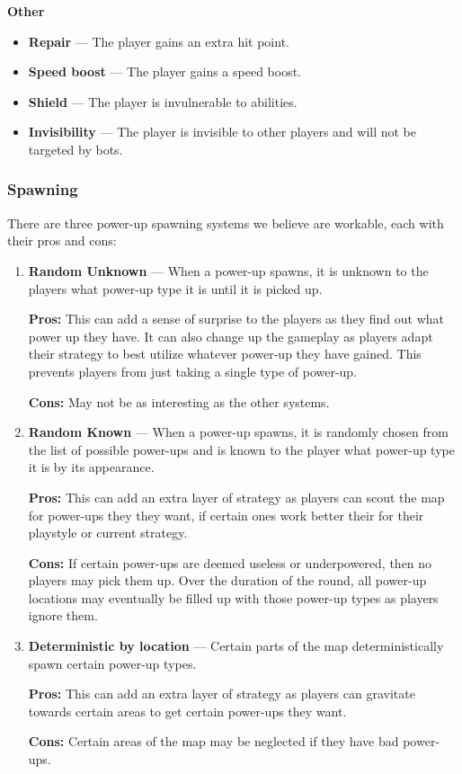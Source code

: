\documentclass{article}
\theoremstyle{definition}
\begin{document}
\textbf{Other}
\begin{itemize}
  \item \textbf{Repair} --- The player gains an extra hit point.
  \item \textbf{Speed boost} --- The player gains a speed boost.
  \item \textbf{}\textbf{Shield} --- The player is invulnerable to abilities.
  \item \textbf{Invisibility} --- The player is invisible to other players and
    will not be targeted by bots.
\end{itemize}

\subsubsection{Spawning}

There are three power-up spawning systems we believe are workable, each with
their pros and cons:

\begin{enumerate}
  \item \textbf{Random Unknown} --- When a power-up spawns, it is unknown to
    the players what power-up type it is until it is picked up.

    \textbf{Pros:} This can add a sense of surprise to the players as they find
    out what power up they have. It can also change up the gameplay as players
    adapt their strategy to best utilize whatever power-up they have gained.
    This prevents players from just taking a single type of power-up.

    \textbf{Cons:} May not be as interesting as the other systems.
  \item \textbf{Random Known} --- When a power-up spawns, it is randomly chosen
    from the list of possible power-ups and is known to the player what
    power-up type it is by its appearance.

    \textbf{Pros:} This can add an extra layer of strategy as players can
    scout the map for power-ups they they want, if certain ones work better
    their for their playstyle or current strategy.

    \textbf{Cons:} If certain power-ups are deemed useless or underpowered,
    then no players may pick them up. Over the duration of the round, all
    power-up locations may eventually be filled up with those power-up types as
    players ignore them.
  \item \textbf{Deterministic by location} --- Certain parts of the map
    deterministically spawn certain power-up types.

    \textbf{Pros:} This can add an extra layer of strategy as players can
    gravitate towards certain areas to get certain power-ups they want.

    \textbf{Cons:} Certain areas of the map may be neglected if they have bad
    power-ups.
\end{enumerate}
\end{document}
